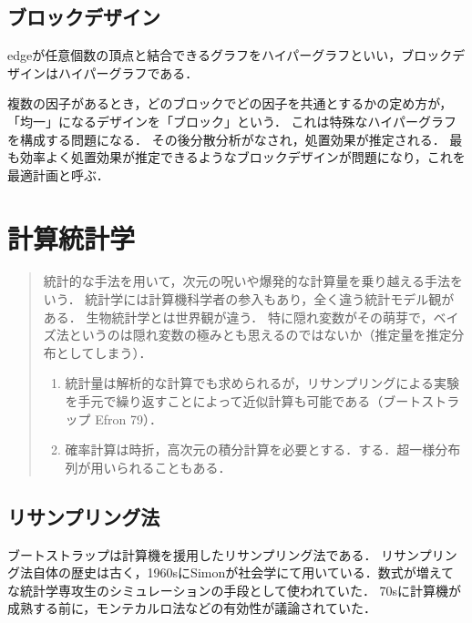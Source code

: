 \documentclass[uplatex,dvipdfmx]{jsreport}
\begin{document}
\section{ブロックデザイン}

\begin{tcolorbox}[colframe=ForestGreen, colback=ForestGreen!10!white,breakable,colbacktitle=ForestGreen!40!white,coltitle=black,fonttitle=\bfseries\sffamily,
title=]
    edgeが任意個数の頂点と結合できるグラフをハイパーグラフといい，ブロックデザインはハイパーグラフである．
\end{tcolorbox}

複数の因子があるとき，どのブロックでどの因子を共通とするかの定め方が，「均一」になるデザインを「ブロック」という．
これは特殊なハイパーグラフを構成する問題になる．
その後分散分析がなされ，処置効果が推定される．
最も効率よく処置効果が推定できるようなブロックデザインが問題になり，これを最適計画と呼ぶ．

\chapter{計算統計学}

\begin{quotation}
    統計的な手法を用いて，次元の呪いや爆発的な計算量を乗り越える手法をいう．
    統計学には計算機科学者の参入もあり，全く違う統計モデル観がある．
    生物統計学とは世界観が違う．
    特に隠れ変数がその萌芽で，ベイズ法というのは隠れ変数の極みとも思えるのではないか（推定量を推定分布としてしまう）．
    \begin{enumerate}
        \item 統計量は解析的な計算でも求められるが，リサンプリングによる実験を手元で繰り返すことによって近似計算も可能である（ブートストラップ Efron 79）．
        \item 確率計算は時折，高次元の積分計算を必要とする．する．超一様分布列が用いられることもある．
    \end{enumerate}
\end{quotation}

\section{リサンプリング法}

\begin{history}
    ブートストラップは計算機を援用したリサンプリング法である．
    リサンプリング法自体の歴史は古く，1960sにSimonが社会学にて用いている．数式が増えてな統計学専攻生のシミュレーションの手段として使われていた．
    70sに計算機が成熟する前に，モンテカルロ法などの有効性が議論されていた．
\end{history}
\end{document}
